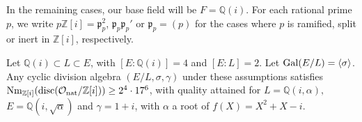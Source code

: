 \documentclass[smallextended]{svjour3}
\newcommand{\Q}{\mathbb{Q}}
\newcommand{\Z}{\mathbb{Z}}
\newcommand{\G}{{\rm Gal}}
\DeclareMathOperator{\Nm}{Nm}
\DeclareMathOperator{\nat}{nat}
\DeclareMathOperator{\disc}{disc}
\begin{document}
In the remaining cases, our base field will be $F = \Q(i)$. For each rational prime $p$, we write $p\Z[i] = \mathfrak p_p^2$, $\mathfrak p_p\mathfrak p_p'$ or $\mathfrak p_p = (p)$ for the cases where $p$ is ramified, split or inert in $\Z[i]$, respectively.

\begin{theorem}
\label{thm:res3} 
Let $\Q(i) \subset L \subset E$, with $[E:\Q(i)] = 4 $ and $[E:L] = 2$. Let $\G(E/L)=\langle \sigma \rangle$. Any cyclic division algebra $\left(E/L, \sigma, \gamma \right)$ under these assumptions satisfies $\Nm_{\Z[i]}(\disc({\cal O}_{\nat}/\Z[i])) \ge 2^4\cdot 17^6$, with quality attained for $L = \Q(i,\alpha),$ $ E = \Q(i,\sqrt{\alpha})$ and {$\gamma=1+i$, with $\alpha$ a root of $f(X)=X^2+X-i$}.
\end{theorem}
\end{document}
